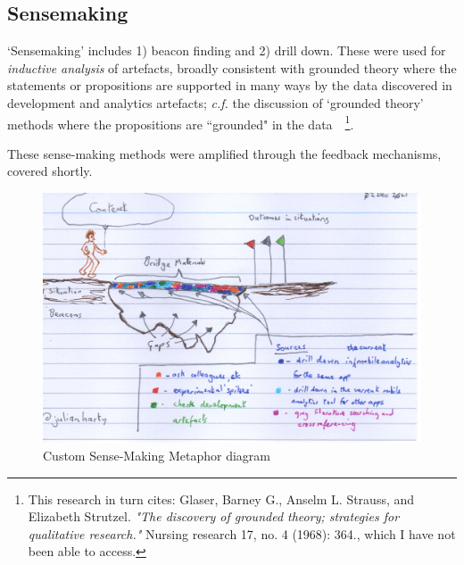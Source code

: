 \subsection{Sensemaking}

`Sensemaking' includes 1) beacon finding and 2) drill down. These were used for \textit{inductive analysis} of artefacts, broadly consistent with grounded theory where the statements or propositions are supported in many ways by the data discovered in development and analytics artefacts; \textit{c.f.} the discussion of `grounded theory' methods where the propositions are ``grounded" in the data~\citep[p.566]{seaman1999_qualitative_methods_in_esse}~\footnote{This research in turn cites:  Glaser, Barney G., Anselm L. Strauss, and Elizabeth Strutzel. \emph{"The discovery of grounded theory; strategies for qualitative research."} Nursing research 17, no. 4 (1968): 364., which I have not been able to access.}. 


These sense-making methods were amplified through the feedback mechanisms, covered shortly. 

\begin{figure}
    \centering
    \includegraphics[width=15cm]{images/rough-sketches/the-sense-making-metafor-revised.jpeg}
    \caption{Custom Sense-Making Metaphor diagram}
    \label{fig:the-sense-making-metafor-revised}
\end{figure}

